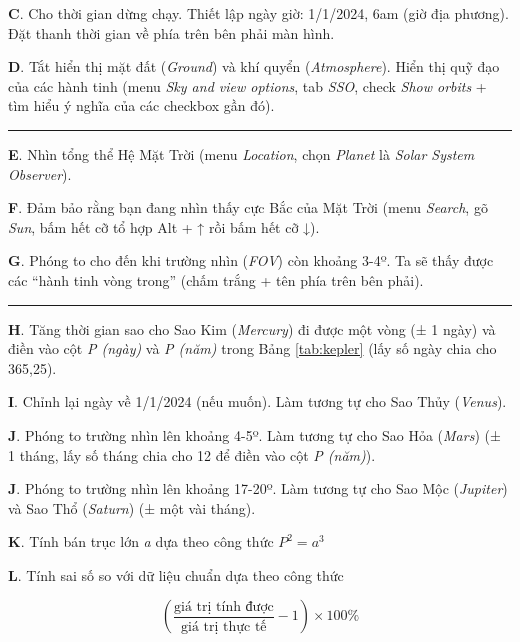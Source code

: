 \documentclass[
  a4paper,
]{book}
\begin{document}
\textbf{C}. Cho thời gian dừng chạy. Thiết lập ngày giờ: 1/1/2024, 6am (giờ địa phương). Đặt thanh thời gian về phía trên bên phải màn hình.

\textbf{D}. Tắt hiển thị mặt đất (\emph{Ground}) và khí quyển (\emph{Atmosphere}). Hiển thị quỹ đạo của các hành tinh (menu \emph{Sky and view options}, tab \emph{SSO}, check \emph{Show orbits} + tìm hiểu ý nghĩa của các checkbox gần đó).

\begin{center}\rule{0.5\linewidth}{0.5pt}\end{center}

\textbf{E}. Nhìn tổng thể Hệ Mặt Trời (menu \emph{Location}, chọn \emph{Planet} là \emph{Solar System Observer}).

\textbf{F}. Đảm bảo rằng bạn đang nhìn thấy cực Bắc của Mặt Trời (menu \emph{Search}, gõ \emph{Sun}, bấm hết cỡ tổ hợp Alt + ↑ rồi bấm hết cỡ ↓).

\textbf{G}. Phóng to cho đến khi trường nhìn (\emph{FOV}) còn khoảng 3-4º. Ta sẽ thấy được các ``hành tinh vòng trong'' (chấm trắng + tên phía trên bên phải).

\begin{center}\rule{0.5\linewidth}{0.5pt}\end{center}

\textbf{H}. Tăng thời gian sao cho Sao Kim (\emph{Mercury}) đi được một vòng (± 1 ngày) và điền vào cột \emph{P (ngày)} và \emph{P (năm)} trong Bảng \ref{tab:kepler} (lấy số ngày chia cho 365,25).

\textbf{I}. Chỉnh lại ngày về 1/1/2024 (nếu muốn). Làm tương tự cho Sao Thủy (\emph{Venus}).

\textbf{J}. Phóng to trường nhìn lên khoảng 4-5º. Làm tương tự cho Sao Hỏa (\emph{Mars}) (± 1 tháng, lấy số tháng chia cho 12 để điền vào cột \emph{P (năm)}).

\textbf{J}. Phóng to trường nhìn lên khoảng 17-20º. Làm tương tự cho Sao Mộc (\emph{Jupiter}) và Sao Thổ (\emph{Saturn}) (± một vài tháng).

\textbf{K}. Tính bán trục lớn \emph{a} dựa theo công thức \(P^2 = a^3\)

\textbf{L}. Tính sai số so với dữ liệu chuẩn dựa theo công thức

\[\left(\frac{\text{giá trị tính được}}{\text{giá trị thực tế}} - 1\right) \times 100\%\]
\end{document}
